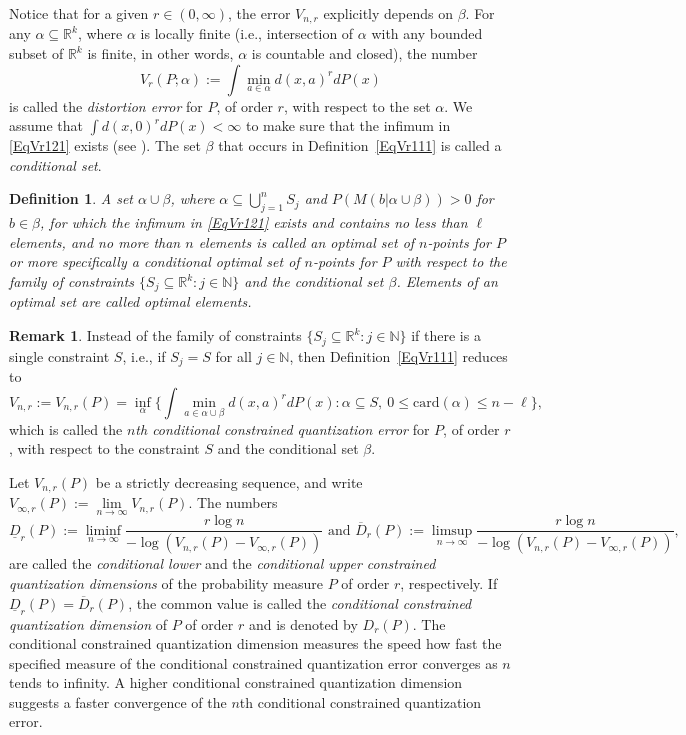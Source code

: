 \documentclass[12pt, reqno]{amsart}
\theoremstyle{plain}
\newtheorem{defi}[subsection]{Definition}
\theoremstyle{definition}
\newtheorem{remark}[subsection]{Remark}
\newcommand{\uu}{\cup}%
\newcommand{\UU}{\bigcup}%
\newcommand{\ci}{\subseteq}%
\newcommand{\set}[1]{\{#1\}}%
\newcommand{\ga}{\alpha}
\newcommand{\gb}{\beta}
\newcommand{\tit}{\textit}%
\newcommand{\D}[1]{\mathbb{#1}}%
\newcommand{\te}{\text}%
\newcommand{\ol}{\overline}
\newcommand{\ul}{\underline}
\begin{document}
 

 
Notice that for a given $r\in (0, \infty)$, the error $V_{n, r}$ explicitly depends on $\gb$. 
For any $\ga\ci \D R^k$, where $\ga$ is locally finite (i.e., intersection of $\ga$ with any bounded subset of $\D R^k$ is finite, in other words,  $\ga$ is countable and closed),
the number 
\begin{equation}
  V_r(P; \ga):= \int \mathop{\min}\limits_{a\in\ga} d(x, a)^r dP(x)
\end{equation}
is called the \tit{distortion error} for $P$, of order $r$, with respect to the set $\ga$. 
We assume that $\int d(x, 0)^r dP(x)<\infty$ to make sure that the infimum in \eqref{EqVr121} exists (see \cite{PR1}). The set $\gb$ that occurs in Definition~\ref{EqVr111} is called a \tit{conditional set}. 
\begin{defi}
A set $ \ga\uu\gb$, where $\ga \ci \mathop{\UU}_{j=1}^n S_j$ and $P(M(b|\ga\uu \gb))>0$ for $b\in \gb$, for which the infimum in  \eqref{EqVr121} exists and contains no less than $\ell$ elements, and no more than $n$ elements is called an \tit{optimal set of $n$-points} for $P$ or more specifically a \tit{conditional optimal set of $n$-points} for $P$ with respect to the family of constraints $\set{S_j\ci \D R^k: j\in \D N}$ and the conditional set $\gb$. Elements of an optimal set are called \tit{optimal elements}. 
\end{defi}

\begin{remark} \label{EqVr2}
Instead of the family of constraints $\set{S_j \ci \D R^k : j\in \D N}$ if there is a single constraint $S$, i.e.,  if $S_j=S$ for all $j\in \D N$, then Definition~\ref{EqVr111} reduces to 
\[
V_{n, r}:=V_{n, r}(P)=\inf_{\ga} \Big\{\int \mathop{\min}\limits_{a\in\ga\uu\gb} d(x, a)^r dP(x) : \ga \ci S, ~ 0\leq  \text{card}(\ga) \leq n-\ell \Big\},
\]
which is called the \tit {$n$th conditional constrained quantization
error} for $P$, of order $r$, with respect to the constraint $S$ and the conditional set $\gb$.
\end{remark}
 Let $V_{n, r}(P)$ be a strictly decreasing sequence, and write $V_{\infty, r}(P):=\mathop{\lim}\limits_{n\to \infty} V_{n, r}(P)$.   The numbers
\begin{equation} \label{eq55} \ul D_r(P):=\liminf_{n\to \infty}  \frac{r\log n}{-\log (V_{n, r}(P)-V_{\infty, r}(P))} \te{ and } \ol D_r(P):=\limsup_{n\to \infty} \frac{r\log n}{-\log (V_{n, r}(P)-V_{\infty, r}(P))}, \end{equation}
are called the \tit{conditional lower} and the \tit{conditional upper constrained quantization dimensions} of the probability measure $P$ of order $r$, respectively. If $\ul D_r (P)=\ol D_r (P)$, the common value is called the \tit{conditional constrained quantization dimension} of $P$ of order $r$ and is denoted by $D_r(P)$. The conditional constrained quantization dimension measures the speed how fast the specified measure of the conditional constrained quantization error converges as $n$ tends to infinity. A higher conditional constrained quantization dimension suggests a faster convergence of the $n$th conditional constrained quantization error.
\end{document}
